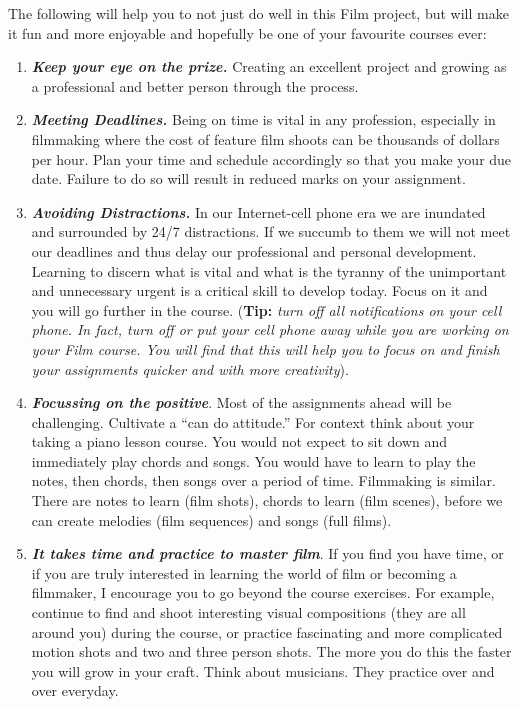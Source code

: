 \documentclass[
]{book}
\begin{document}
The following will help you to not just do well in this Film project, but will make it fun and more enjoyable and hopefully be one of your favourite courses ever:

\begin{enumerate}
\def\labelenumi{\arabic{enumi}.}
\item
  \textbf{\emph{Keep your eye on the prize.}} Creating an excellent project and growing as a professional and better person through the process.
\item
  \textbf{\emph{Meeting Deadlines.}} Being on time is vital in any profession, especially in filmmaking where the cost of feature film shoots can be thousands of dollars per hour. Plan your time and schedule accordingly so that you make your due date. Failure to do so will result in reduced marks on your assignment.
\item
  \textbf{\emph{Avoiding Distractions.}} In our Internet-cell phone era we are inundated and surrounded by 24/7 distractions. If we succumb to them we will not meet our deadlines and thus delay our professional and personal development. Learning to discern what is vital and what is the tyranny of the unimportant and unnecessary urgent is a critical skill to develop today. Focus on it and you will go further in the course. (\textbf{Tip:} \emph{turn off all notifications on your cell phone. In fact, turn off or put your cell phone away while you are working on your Film course. You will find that this will help you to focus on and finish your assignments quicker and with more creativity}).
\item
  \textbf{\emph{Focussing on the positive}}. Most of the assignments ahead will be challenging. Cultivate a ``can do attitude.'' For context think about your taking a piano lesson course. You would not expect to sit down and immediately play chords and songs. You would have to learn to play the notes, then chords, then songs over a period of time. Filmmaking is similar. There are notes to learn (film shots), chords to learn (film scenes), before we can create melodies (film sequences) and songs (full films).
\item
  \textbf{\emph{It takes time and practice to master film}}. If you find you have time, or if you are truly interested in learning the world of film or becoming a filmmaker, I encourage you to go beyond the course exercises. For example, continue to find and shoot interesting visual compositions (they are all around you) during the course, or practice fascinating and more complicated motion shots and two and three person shots. The more you do this the faster you will grow in your craft. Think about musicians. They practice over and over everyday.

\end{enumerate}
\end{document}
